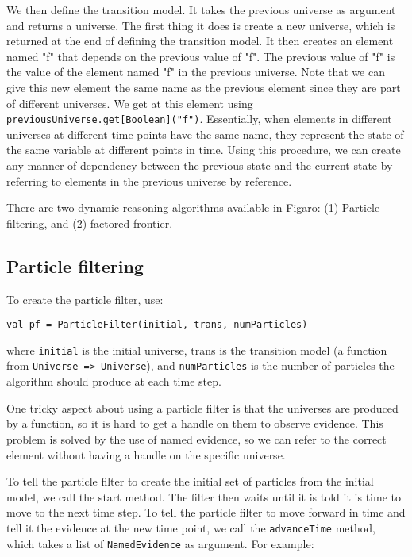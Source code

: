 We then define the transition model. It takes the previous universe as argument and returns a universe. The first thing it does is create a new universe, which is returned at the end of defining the transition model. It then creates an element named "f" that depends on the previous value of "f". The previous value of  "f" is the value of the element named "f" in the previous universe. Note that we can give this new element the same name as the previous element since they are part of different universes. We get at this element using \texttt{previousUniverse.get[Boolean]("f")}. Essentially, when elements in different universes at different time points have the same name, they represent the state of the same variable at different points in time. Using this procedure, we can create any manner of dependency between the previous state and the current state by referring to elements in the previous universe by reference.

There are two dynamic reasoning algorithms available in Figaro: (1) Particle filtering, and (2) factored frontier.

\subsection{Particle filtering}

To create the particle filter, use:

\begin{flushleft}
\texttt{val pf = ParticleFilter(initial, trans, numParticles)}
\end{flushleft}

where \texttt{initial} is the initial universe, trans is the transition model (a function from \texttt{Universe => Universe}), and \texttt{numParticles} is the number of particles the algorithm should produce at each time step.

One tricky aspect about using a particle filter is that the universes are produced by a function, so it is hard to get a handle on them to observe evidence. This problem is solved by the use of named evidence, so we can refer to the correct element without having a handle on the specific universe.

To tell the particle filter to create the initial set of particles from the initial model, we call the start method. The filter then waits until it is told it is time to move to the next time step. To tell the particle
filter to move forward in time and tell it the evidence at the new time point, we call the \texttt{advanceTime} method, which takes a list of \texttt{NamedEvidence} as argument. For example:
 
